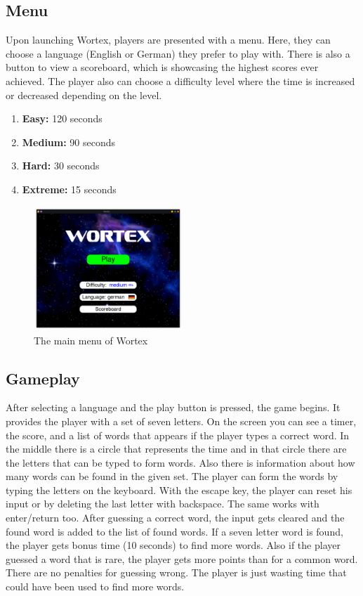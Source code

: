 \documentclass{article}[12pt]
\begin{document}
    \subsection*{Menu}

    Upon launching Wortex, players are presented with a menu. Here, they can
    choose a language (English or German) they prefer to play with. There is also
    a button to view a scoreboard, which is showcasing the highest scores ever
    achieved. The player also can choose a difficulty level where the time is 
    increased or decreased depending on the level.

    \begin{enumerate}
        \item \textbf{Easy:} 120 seconds
        \item \textbf{Medium:} 90 seconds
        \item \textbf{Hard:} 30 seconds
        \item \textbf{Extreme:} 15 seconds
    \end{enumerate}

    \begin{figure}[ht]
        \centering
        \includegraphics[width=0.5\textwidth]{pictures/menu.png}
        \caption{The main menu of Wortex}
    \end{figure}


    \subsection*{Gameplay}

    After selecting a language and the play button is pressed, the game begins.
    It provides the player with a set of seven letters. On the screen you can
    see a timer, the score, and a list of words that appears if the player
    types a correct word. In the middle there is a circle that represents the
    time and in that circle there are the letters that can be typed to form
    words. Also there is information about how many words can be found in the
    given set. The player can form the words by typing the letters on the
    keyboard. With the escape key, the player can reset his input or by
    deleting the last letter with backspace. The same works with enter\slash return too.
    After guessing a correct word, the input gets cleared and the found word is
    added to the list of found words. If a seven letter word is found, the
    player gets bonus time (10 seconds) to find more words. Also if the player
    guessed a word that is rare, the player gets more points than for a common
    word. There are no penalties for guessing wrong. The player is just wasting
    time that could have been used to find more words. 
\end{document}
